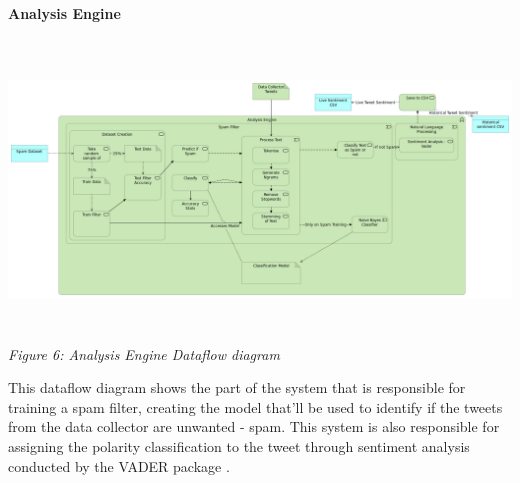 \documentclass[oneside, 12pt]{article}
\begin{document}
		\textbf{Analysis Engine}
		\begin{center}
			\includegraphics[width=17cm,height=8cm]{images/Analysis_Engine.png}
			\textit{Figure 6: Analysis Engine Dataflow diagram}
		\end{center}
		This dataflow diagram shows the part of the system that is responsible for training a spam filter, creating the model that'll be used to identify if the tweets from the data collector are unwanted - spam. This system is also responsible for assigning the polarity classification to the tweet through sentiment analysis conducted by the VADER package \cite{VADERPaper}.
\end{document}
